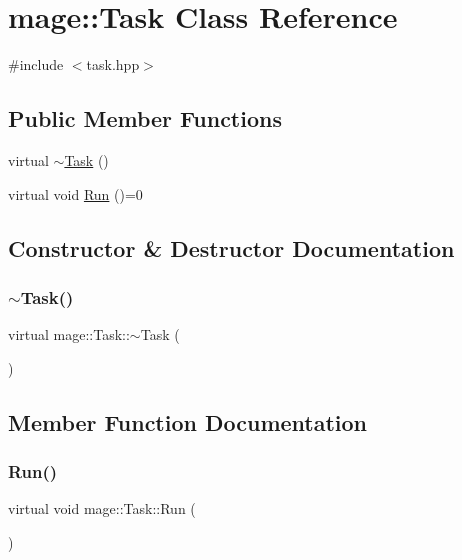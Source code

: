 \hypertarget{classmage_1_1_task}{}\section{mage\+:\+:Task Class Reference}
\label{classmage_1_1_task}


{\ttfamily \#include $<$task.\+hpp$>$}

\subsection*{Public Member Functions}
\begin{DoxyCompactItemize}
\item 
virtual \hyperlink{classmage_1_1_task_a66a892ec09928a904c7c156098a1abbf}{$\sim$\+Task} ()
\item 
virtual void \hyperlink{classmage_1_1_task_af400f88a357ccfa15b860a6b58dc0598}{Run} ()=0
\end{DoxyCompactItemize}


\subsection{Constructor \& Destructor Documentation}
\hypertarget{classmage_1_1_task_a66a892ec09928a904c7c156098a1abbf}{}\label{classmage_1_1_task_a66a892ec09928a904c7c156098a1abbf} 
\subsubsection{\texorpdfstring{$\sim$\+Task()}{~Task()}}
{\footnotesize\ttfamily virtual mage\+::\+Task\+::$\sim$\+Task (\begin{DoxyParamCaption}{ }\end{DoxyParamCaption})\hspace{0.3cm}{\ttfamily [virtual]}}



\subsection{Member Function Documentation}
\hypertarget{classmage_1_1_task_af400f88a357ccfa15b860a6b58dc0598}{}\label{classmage_1_1_task_af400f88a357ccfa15b860a6b58dc0598} 
\subsubsection{\texorpdfstring{Run()}{Run()}}
{\footnotesize\ttfamily virtual void mage\+::\+Task\+::\+Run (\begin{DoxyParamCaption}{ }\end{DoxyParamCaption})\hspace{0.3cm}{\ttfamily [pure virtual]}}

